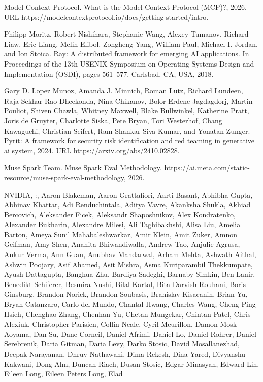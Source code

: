 Model Context Protocol. What is the Model Context Protocol (MCP)?, 2026.
URL https://modelcontextprotocol.io/docs/getting-started/intro.

Philipp Moritz, Robert Nishihara, Stephanie Wang, Alexey Tumanov,
Richard Liaw, Eric Liang, Melih Elibol, Zongheng Yang, William Paul,
Michael I. Jordan, and Ion Stoica. Ray: A distributed framework for
emerging AI applications. In Proceedings of the 13th USENIX Symposium on
Operating Systems Design and Implementation (OSDI), pages 561--577,
Carlsbad, CA, USA, 2018.

Gary D. Lopez Munoz, Amanda J. Minnich, Roman Lutz, Richard Lundeen,
Raja Sekhar Rao Dheekonda, Nina Chikanov, Bolor-Erdene Jagdagdorj,
Martin Pouliot, Shiven Chawla, Whitney Maxwell, Blake Bullwinkel,
Katherine Pratt, Joris de Gruyter, Charlotte Siska, Pete Bryan, Tori
Westerhof, Chang Kawaguchi, Christian Seifert, Ram Shankar Siva Kumar,
and Yonatan Zunger. Pyrit: A framework for security risk identification
and red teaming in generative ai system, 2024. URL
https://arxiv.org/abs/2410.02828.

Muse Spark Team. Muse Spark Eval Methodology.
https://ai.meta.com/static-resource/muse-spark-eval-methodology, 2026.

NVIDIA, :, Aaron Blakeman, Aaron Grattafiori, Aarti Basant, Abhibha
Gupta, Abhinav Khattar, Adi Renduchintala, Aditya Vavre, Akanksha
Shukla, Akhiad Bercovich, Aleksander Ficek, Aleksandr Shaposhnikov, Alex
Kondratenko, Alexander Bukharin, Alexandre Milesi, Ali Taghibakhshi,
Alisa Liu, Amelia Barton, Ameya Sunil Mahabaleshwarkar, Amir Klein, Amit
Zuker, Amnon Geifman, Amy Shen, Anahita Bhiwandiwalla, Andrew Tao,
Anjulie Agrusa, Ankur Verma, Ann Guan, Anubhav Mandarwal, Arham Mehta,
Ashwath Aithal, Ashwin Poojary, Asif Ahamed, Asit Mishra, Asma
Kuriparambil Thekkumpate, Ayush Dattagupta, Banghua Zhu, Bardiya
Sadeghi, Barnaby Simkin, Ben Lanir, Benedikt Schiferer, Besmira Nushi,
Bilal Kartal, Bita Darvish Rouhani, Boris Ginsburg, Brandon Norick,
Brandon Soubasis, Branislav Kisacanin, Brian Yu, Bryan Catanzaro, Carlo
del Mundo, Chantal Hwang, Charles Wang, Cheng-Ping Hsieh, Chenghao
Zhang, Chenhan Yu, Chetan Mungekar, Chintan Patel, Chris Alexiuk,
Christopher Parisien, Collin Neale, Cyril Meurillon, Damon Mosk-Aoyama,
Dan Su, Dane Corneil, Daniel Afrimi, Daniel Lo, Daniel Rohrer, Daniel
Serebrenik, Daria Gitman, Daria Levy, Darko Stosic, David Mosallanezhad,
Deepak Narayanan, Dhruv Nathawani, Dima Rekesh, Dina Yared, Divyanshu
Kakwani, Dong Ahn, Duncan Riach, Dusan Stosic, Edgar Minasyan, Edward
Lin, Eileen Long, Eileen Peters Long, Elad



